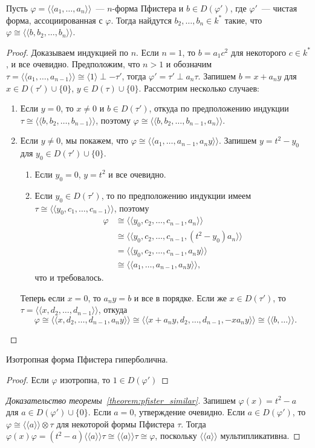 \documentclass[a4paper,oneside,12pt]{article}
\theoremstyle{plain} { \swapnumbers
\newtheorem{theorem}{Теорема}[subsection]
\newtheorem{corollary}[theorem]{Следствие}
\newtheorem{lemma}[theorem]{Лемма}
\newtheorem{proposition}[theorem]{Утверждение}
\newtheorem{claim}[theorem]{Факт}
}
\theoremstyle{definition} { \swapnumbers
\newtheorem{definition}[theorem]{Определение}
\newtheorem{notation}[theorem]{Обозначение}
\newtheorem{remark}[theorem]{Замечание}
\newtheorem{remarks}[theorem]{Замечания}
\newtheorem{example}[theorem]{Пример}
\newtheorem{examples}[theorem]{Примеры}
\newtheorem{sssection}[theorem]{}
}
\def\ph{\varphi}
\def\la{\langle}
\def\ra{\rangle}
\def\lla{\la\!\la}
\def\rra{\ra\!\ra}
\begin{document}
\begin{proposition}\label{prop:pfister_pure_value}
Пусть $\ph=\lla a_1,\dots,a_n\rra$~--- $n$-форма Пфистера и $b\in D(\ph')$, где $\ph'$~--- чистая форма,
ассоциированная с $\ph$. Тогда найдутся $b_2,\dots,b_n\in k^*$ такие, что
$\ph\cong\lla b,b_2,\dots,b_n\rra$.
\end{proposition}
\begin{proof}
Доказываем индукцией по $n$. Если $n=1$, то $b=a_1c^2$ для некоторого $c\in k^*$, и все очевидно.
Предположим, что $n>1$ и обозначим $\tau=\lla a_1,\dots,a_{n-1}\rra\cong\la 1\ra\perp -\tau'$,
тогда $\ph'=\tau'\perp a_n\tau$.
Запишем $b=x+a_ny$ для $x\in D(\tau')\cup\{0\}$, $y\in D(\tau)\cup\{0\}$. Рассмотрим несколько случаев:
\begin{enumerate}
\item Если $y=0$, то $x\neq 0$ и $b\in D(\tau')$, откуда по предположению индукции $\tau\cong\lla b,b_2,\dots,b_{n-1}\rra$,
поэтому $\ph\cong\lla b,b_2,\dots,b_{n-1},a_n\rra$.
\item Если $y\neq 0$, мы покажем, что $\ph\cong\lla a_1,\dots,a_{n-1},a_ny\rra$. Запишем $y=t^2-y_0$ для $y_0\in D(\tau')\cup\{0\}$.
\begin{enumerate}
\item Если $y_0=0$, $y=t^2$ и все очевидно.
\item Если $y_0\in D(\tau')$, то по предположению индукции имеем
$\tau\cong\lla y_0,c_1,\dots,c_{n-1}\rra$, поэтому
$$
\begin{aligned}
\ph&\cong\lla y_0,c_2,\dots,c_{n-1},a_n\rra\\
&\cong\lla y_0,c_2,\dots,c_{n-1},(t^2-y_0)a_n\rra\\
&=\lla y_0,c_2,\dots,c_{n-1},a_ny\rra\\
&\cong\lla a_1,\dots,a_{n-1},a_ny\rra,
\end{aligned}
$$
что и требовалось.
\end{enumerate}
Теперь если $x=0$, то $a_ny=b$ и все в порядке. Если же $x\in D(\tau')$, то $\tau=\lla x,d_2,\dots,d_{n-1}\rra$,
откуда
$$\ph\cong\lla x,d_2,\dots,d_{n-1},a_ny\rra
\cong\lla x+a_ny,d_2,\dots,d_{n-1},-xa_ny\rra
\cong\lla b,\dots\rra.$$
\end{enumerate}
\end{proof}

\begin{corollary}
Изотропная форма Пфистера гиперболична.
\end{corollary}
\begin{proof}
Если $\ph$ изотропна, то $1\in D(\ph')$
\end{proof}
\begin{proof}[Доказательство теоремы~\ref{theorem:pfister_similar}]
Запишем $\ph(x)=t^2-a$ для $a\in D(\ph')\cup\{0\}$. Если $a=0$, утверждение очевидно.
Если $a\in D(\ph')$, то $\ph\cong\lla a\rra\otimes\tau$ для некоторой формы Пфистера $\tau$.
Тогда $\ph(x)\ph=(t^2-a)\lla a\rra\tau\cong\lla a\rra\tau\cong\ph$, поскольку $\lla a\rra$
мультипликативна.
\end{proof}
\end{document}
